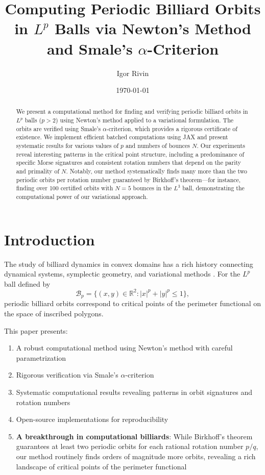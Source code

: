\documentclass[11pt]{amsart}
\title{Computing Periodic Billiard Orbits in $L^p$ Balls via Newton's Method and Smale's $\alpha$-Criterion}
\author{Igor Rivin}\thanks{with much help from Claude Code}
\date{\today}
\theoremstyle{plain}
\theoremstyle{definition}
\theoremstyle{remark}
\begin{document}
\begin{abstract}
We present a computational method for finding and verifying periodic billiard orbits in $L^p$ balls ($p > 2$) using Newton's method applied to a variational formulation. The orbits are verified using Smale's $\alpha$-criterion, which provides a rigorous certificate of existence. We implement efficient batched computations using JAX and present systematic results for various values of $p$ and numbers of bounces $N$. Our experiments reveal interesting patterns in the critical point structure, including a predominance of specific Morse signatures and consistent rotation numbers that depend on the parity and primality of $N$. Notably, our method systematically finds many more than the two periodic orbits per rotation number guaranteed by Birkhoff's theorem—for instance, finding over 100 certified orbits with $N=5$ bounces in the $L^3$ ball, demonstrating the computational power of our variational approach.
\end{abstract}
\maketitle

\section{Introduction}

The study of billiard dynamics in convex domains has a rich history connecting dynamical systems, symplectic geometry, and variational methods \cite{birkhoff1927dynamical,tabachnikov2005geometry}. For the $L^p$ ball defined by
\[
\mathcal{B}_p = \{(x,y) \in \mathbb{R}^2 : |x|^p + |y|^p \leq 1\},
\]
periodic billiard orbits correspond to critical points of the perimeter functional on the space of inscribed polygons.

This paper presents:
\begin{enumerate}
\item A robust computational method using Newton's method with careful parametrization
\item Rigorous verification via Smale's $\alpha$-criterion
\item Systematic computational results revealing patterns in orbit signatures and rotation numbers
\item Open-source implementations for reproducibility
\item \textbf{A breakthrough in computational billiards}: While Birkhoff's theorem guarantees at least two periodic orbits for each rational rotation number $p/q$, our method routinely finds orders of magnitude more orbits, revealing a rich landscape of critical points of the perimeter functional
\end{enumerate}
\end{document}
